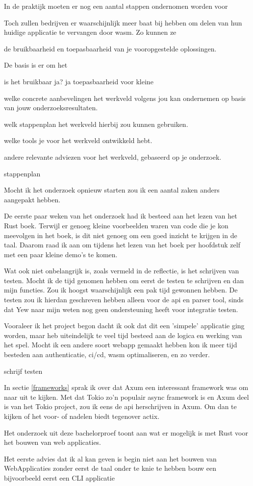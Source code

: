 In de praktijk moeten er nog een aantal stappen ondernomen worden voor 

Toch zullen bedrijven er waarschijnlijk meer baat bij hebben om delen van hun huidige applicatie te
vervangen door wasm. Zo kunnen ze 



de bruikbaarheid en toepasbaarheid van je vooropgestelde oplossingen.

De basis is er om het 


is het bruikbaar ja? ja
toepasbaarheid voor kleine  

welke concrete aanbevelingen het werkveld volgens jou kan ondernemen op basis van jouw onderzoeksresultaten.

welk stappenplan het werkveld hierbij zou kunnen gebruiken.

welke tools je voor het werkveld ontwikkeld hebt.

andere relevante adviezen voor het werkveld, gebaseerd op je onderzoek.


stappenplan

Mocht ik het onderzoek opnieuw starten zou ik een aantal zaken anders aangepakt hebben.

De eerste paar weken van het onderzoek had ik besteed aan het lezen van het Rust boek. Terwijl er
genoeg kleine voorbeelden waren van code die je kon meevolgen in het boek, is dit niet genoeg om
een goed inzicht te krijgen in de taal. Daarom raad ik aan om tijdens het lezen van het boek per
hoofdstuk zelf met een paar kleine demo's te komen.

Wat ook niet onbelangrijk is, zoals vermeld in de reflectie, is het schrijven van testen. Mocht ik
de tijd genomen hebben om eerst de testen te schrijven en dan mijn functies. Zou ik hoogst
waarschijnlijk een pak tijd gewonnen hebben. De testen zou ik hierdan geschreven hebben alleen voor
de api en parser tool, sinds dat Yew naar mijn weten nog geen ondersteuning heeft voor integratie
testen.

Vooraleer ik het project begon dacht ik ook dat dit een 'simpele' applicatie ging worden, maar heb
uiteindelijk te veel tijd besteed aan de logica en werking van het spel. Mocht ik een andere soort
webapp gemaakt hebben kon ik meer tijd besteden aan authenticatie, ci/cd, wasm optimaliseren, en zo
verder.

schrijf testen


In sectie \ref{frameworks} sprak ik over dat Axum een interessant framework was om naar uit te
kijken. Met dat Tokio zo'n populair async framework is en Axum deel is van het Tokio project, zou ik
eens de api herschrijven in Axum. Om dan te kijken of het voor- of nadelen biedt tegenover actix.



Het onderzoek uit deze bachelorproef toont aan wat er mogelijk is met Rust voor het bouwen van web
applicaties.

Het eerste advies dat ik al kan geven is begin niet aan het bouwen van WebApplicaties zonder eerst
de taal onder te knie te hebben
bouw een bijvoorbeeld eerst een CLI applicatie
